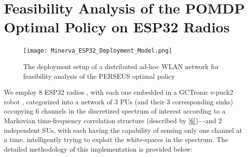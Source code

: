 \documentclass[12pt, draftcls, onecolumn]{IEEEtran}
\begin{document}
\section{Feasibility Analysis of the POMDP Optimal Policy on ESP32 Radios}\label{D}
\begin{figure} [htb]
    \centerline{
    \texttt{[image: Minerva\_ESP32\_Deployment\_Model.png]}}
    \caption{The deployment setup of a distributed ad-hoc WLAN network for feasibility analysis of the PERSEUS optimal policy}
    \label{fig: C. 0}
\end{figure}
We employ $8$ ESP32 radios \cite{Espressif:ESP32}, with each one embedded in a GCTronic e-puck2 robot \cite{GCTronic:epuck2}, categorized into a network of $3$ PUs (and their $3$ corresponding sinks) occupying $6$ channels in the discretized spectrum of interest according to a Markovian time-frequency correlation structure (described by \eqref{6})\texttt{-{}-}and $2$ independent SUs, with each having the capability of sensing only one channel at a time, intelligently trying to exploit the white-spaces in the spectrum. The detailed methodology of this implementation is provided below:
\end{document}
